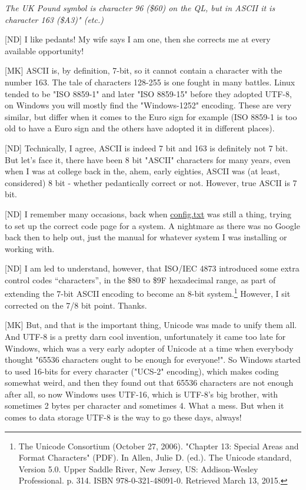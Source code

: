\emph{The UK Pound symbol is character 96 (\$60) on the QL, but in ASCII
it is character 163 (\$A3)" (etc.)}

[ND] I like pedants! My wife says I am one, then she corrects me at every available opportunity!


[MK] ASCII is, by definition, 7-bit, so it cannot contain a character with
the number 163. The tale of characters 128-255 is one fought in many
battles. Linux tended to be "ISO 8859-1" and later "ISO 8859-15"
before they adopted UTF-8, on Windows you will mostly find the
"Windows-1252" encoding. These are very similar, but differ when it
comes to the Euro sign for example (ISO 8859-1 is too old to have a
Euro sign and the others have adopted it in different places).

[ND] Technically, I agree, ASCII is indeed 7 bit and 163 is definitely not 7 bit. But let's face it, there have been 8 bit "ASCII" characters for many years, even when I was at college back in the, ahem, early eighties, ASCII was (at least, considered) 8 bit - whether pedantically correct or not. However, true ASCII is 7 bit.

[ND] I remember many occasions, back when \url{config.txt} was still a thing, trying to set up the correct code page for a system. A nightmare as there was no Google back then to help out, just the manual for whatever system I was installing or working with.

[ND] I am led to understand, however, that ISO/IEC 4873 introduced some extra control codes ``characters'', in the \$80 to \$9F hexadecimal range, as part of extending the 7-bit ASCII encoding to become an 8-bit system.\footnote{The Unicode Consortium (October 27, 2006). "Chapter 13: Special Areas and Format Characters" (PDF). In Allen, Julie D. (ed.). The Unicode standard, Version 5.0. Upper Saddle River, New Jersey, US: Addison-Wesley Professional. p. 314. ISBN 978-0-321-48091-0. Retrieved March 13, 2015.} However, I sit corrected on the 7/8 bit point. Thanks.


[MK] But, and that is the important thing, Unicode was made to unify them
all. And UTF-8 is a pretty darn cool invention, unfortunately it came
too late for Windows, which was a very early adopter of Unicode at a
time when everybody thought "65536 characters ought to be enough for
everyone!". So Windows started to used 16-bits for every character
("UCS-2" encoding), which makes coding somewhat weird, and then they
found out that 65536 characters are not enough after all, so now
Windows uses UTF-16, which is UTF-8's big brother, with sometimes 2
bytes per character and sometimes 4. What a mess. But when it comes to
data storage UTF-8 is the way to go these days, always!

